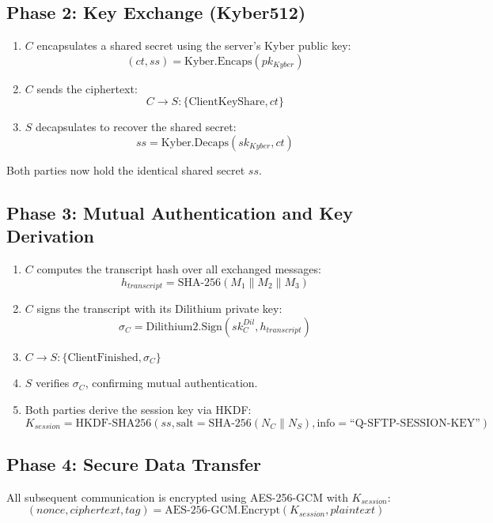 \documentclass[12pt, a4paper]{article}
\begin{document}
\subsection{Phase 2: Key Exchange (Kyber512)}

\begin{enumerate}[label=\arabic*., itemsep=2pt]
    \item $C$ encapsulates a shared secret using the server's Kyber public key:
    \[
    (ct, ss) = \text{Kyber.Encaps}(pk_{Kyber})
    \]
    \item $C$ sends the ciphertext:
    \[
    C \rightarrow S : \{\text{ClientKeyShare}, ct\}
    \]
    \item $S$ decapsulates to recover the shared secret:
    \[
    ss = \text{Kyber.Decaps}(sk_{Kyber}, ct)
    \]
\end{enumerate}

Both parties now hold the identical shared secret $ss$.

\subsection{Phase 3: Mutual Authentication and Key Derivation}

\begin{enumerate}[label=\arabic*., itemsep=2pt]
    \item $C$ computes the transcript hash over all exchanged messages:
    \[
    h_{transcript} = \text{SHA-256}(M_1 \| M_2 \| M_3)
    \]
    \item $C$ signs the transcript with its Dilithium private key:
    \[
    \sigma_C = \text{Dilithium2.Sign}(sk_C^{Dil}, h_{transcript})
    \]
    \item $C \rightarrow S : \{\text{ClientFinished}, \sigma_C\}$
    \item $S$ verifies $\sigma_C$, confirming mutual authentication.
    \item Both parties derive the session key via HKDF:
    \[
    K_{session} = \text{HKDF-SHA256}(ss, \text{salt} = \text{SHA-256}(N_C \| N_S), \text{info} = \text{``Q-SFTP-SESSION-KEY''})
    \]
\end{enumerate}

\subsection{Phase 4: Secure Data Transfer}

All subsequent communication is encrypted using AES-256-GCM with $K_{session}$:
\[
(nonce, ciphertext, tag) = \text{AES-256-GCM.Encrypt}(K_{session}, plaintext)
\]
\end{document}
